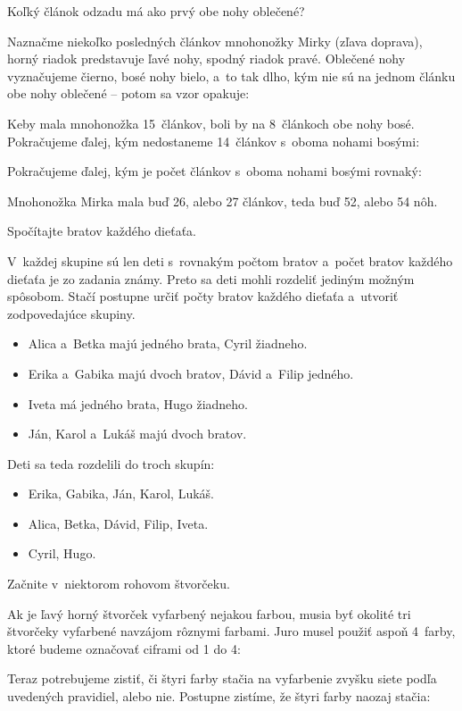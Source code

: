 {%
\napad
Koľký článok odzadu má ako prvý obe nohy oblečené?

\riesenie
Naznačme niekoľko posledných článkov mnohonožky Mirky (zľava doprava), horný riadok predstavuje ľavé nohy, spodný riadok pravé.
Oblečené nohy vyznačujeme čierno, bosé nohy bielo, a~to tak dlho, kým nie sú na jednom článku obe nohy oblečené -- potom sa vzor opakuje:
%


Keby mala mnohonožka 15~článkov, boli by na 8~článkoch obe nohy bosé.
Pokračujeme ďalej, kým nedostaneme 14~článkov s~oboma nohami bosými:
%


Pokračujeme ďalej, kým je počet článkov s~oboma nohami bosými rovnaký:
%


Mnohonožka Mirka mala buď 26, alebo 27 článkov, teda buď 52, alebo 54 nôh.
}

{%
\napad
Spočítajte bratov každého dieťaťa.

\riesenie
V~každej skupine sú len deti s~rovnakým počtom bratov a~počet bratov každého dieťaťa je zo zadania známy.
Preto sa deti mohli rozdeliť jediným možným spôsobom.
Stačí postupne určiť počty bratov každého dieťaťa a~utvoriť zodpovedajúce skupiny.
\begin{itemize}
\item Alica a~Betka majú jedného brata, Cyril žiadneho.
\item Erika a~Gabika majú dvoch bratov, Dávid a~Filip jedného.
\item Iveta má jedného brata, Hugo žiadneho.
\item Ján, Karol a~Lukáš majú dvoch bratov.
\end{itemize}
\noindent
Deti sa teda rozdelili do troch skupín:
\begin{itemize}
\item Erika, Gabika, Ján, Karol, Lukáš.
\item Alica, Betka, Dávid, Filip, Iveta.
\item Cyril, Hugo.
\end{itemize}

}

{%
\napad
Začnite v~niektorom rohovom štvorčeku.

\riesenie
Ak je ľavý horný štvorček vyfarbený nejakou farbou, musia byť okolité tri štvorčeky vyfarbené navzájom rôznymi farbami.
Juro musel použiť aspoň 4~farby, ktoré budeme označovať ciframi od 1 do 4:
%


Teraz potrebujeme zistiť, či štyri farby stačia na vyfarbenie zvyšku siete podľa uvedených pravidiel, alebo nie.
Postupne zistíme, že štyri farby naozaj stačia:
%


}

